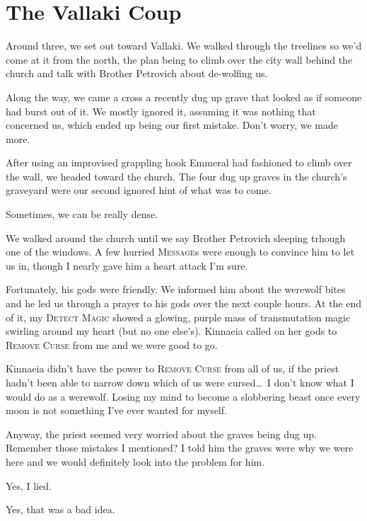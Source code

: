 
\section*{The Vallaki Coup}
Around three, we set out toward Vallaki. We walked through the treelines so we'd come at it from the north, the plan being to climb over the city wall behind the church and talk with Brother Petrovich about de-wolfing us.

Along the way, we came a cross a recently dug up grave that looked as if someone had burst out of it. We mostly ignored it, assuming it was nothing that concerned us, which ended up being our first mistake. Don't worry, we made more.

After using an improvised grappling hook Emmeral had fashioned to climb over the wall, we headed toward the church. The four dug up graves in the church's graveyard were our second ignored hint of what was to come.

Sometimes, we can be really dense.

We walked around the church until we say Brother Petrovich sleeping trhough one of the windows. A few hurried \textsc{Message}s were enough to convince him to let us in, though I nearly gave him a heart attack I'm sure.

Fortunately, his gods were friendly. We informed him about the werewolf bites and he led us through a prayer to his gods over the next couple hours. At the end of it, my \textsc{Detect Magic} showed a glowing, purple mass of transmutation magic swirling around my heart (but no one else's). Kinnaeia called on her gods to \textsc{Remove Curse} from me and we were good to go.

Kinnaeia didn't have the power to \textsc{Remove Curse} from all of us, if the priest hadn't been able to narrow down which of us were cursed\dots\ I don't know what I would do as a werewolf. Losing my mind to become a slobbering beast once every moon is not something I've ever wanted for myself.

Anyway, the priest seemed very worried about the graves being dug up. Remember those mistakes I mentioned? I told him the graves were why we were here and we would definitely look into the problem for him.

Yes, I lied.

Yes, that was a bad idea.

